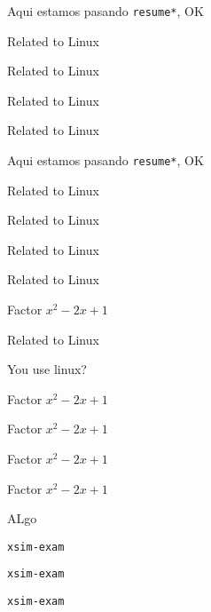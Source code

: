 \documentclass{article}
\begin{document}
Aqui estamos pasando \verb+resume*+, OK

\begin{enumext}[resume]
  \item Related to Linux
  \item Related to Linux
  \item Related to Linux
  \item Related to Linux
\end{enumext}
\stop



Aqui estamos pasando \verb+resume*+, OK

\begin{enumext}[resume*]
  \item Related to Linux
  \item Related to Linux
  \item Related to Linux
  \item Related to Linux
\end{enumext}
\stop



\begin{enumext}[save-ans=simplews,columns=1,check-ans=true,show-pos=true,show-pos=true,show-pos=true,nosep,save-ref=true,wrap-label={\fbox{#1}}]
  \item Factor $x^{2}-2x+1$ 
  \item Related to Linux
    \begin{enumext}[nosep,columns*=2]
      \item You use linux? 
      \item Factor $x^{2}-2x+1$ 
      \item Factor $x^{2}-2x+1$ 
    \end{enumext}
   \item Factor $x^{2}-2x+1$ 
   \item Factor $x^{2}-2x+1$ 
   \item ALgo
         \begin{enumext}[nosep]
          \item* \texttt{xsim-exam} 
           \item* \texttt{xsim-exam} 
            \item* \texttt{xsim-exam} 
        \end{enumext}
\end{enumext}
\end{document}
